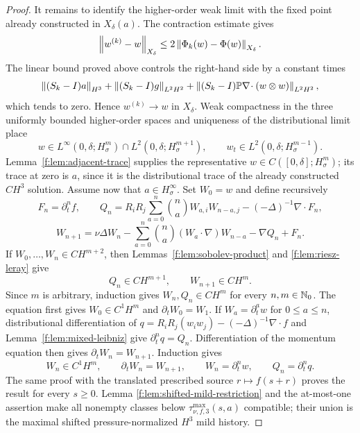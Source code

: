 \begin{proof}
It remains to identify the higher-order weak limit with the fixed point already
constructed in \(X_\delta(a)\).  The contraction estimate gives
\[
 \left\lVert w^{(k)}-w\right\rVert_{X_\delta}
 \le2\left\lVert \Phi_k(w)-\Phi(w)\right\rVert_{X_\delta}.
\]
The linear bound proved above controls the right-hand side by a constant times
\[
 \left\lVert (S_k-I)a\right\rVert_{H^3}
 +\left\lVert (S_k-I)g\right\rVert_{L^2H^2}
 +\left\lVert (S_k-I)\mathbb P\nabla\!\cdot(w\otimes w)\right\rVert_{L^2H^2},
\]
which tends to zero.  Hence \(w^{(k)}\to w\) in \(X_\delta\).  Weak
compactness in the three uniformly bounded higher-order spaces and uniqueness
of the distributional limit place
\[
 w\in L^\infty(0,\delta;H^m_\sigma)\cap L^2(0,\delta;H^{m+1}_\sigma),
 \qquad w_t\in L^2(0,\delta;H^{m-1}_\sigma).
\]
Lemma~\ref{f:lem:adjacent-trace} supplies the representative
\(w\in C([0,\delta];H^m_\sigma)\); its trace at zero is \(a\), since it is
the distributional trace of the already constructed \(C H^3\) solution.
Assume now that \(a\in H^\infty_\sigma\).  Set \(W_0=w\) and define
recursively
\[
 F_n=\partial_t^nf,\qquad
 Q_n=R_iR_j\sum_{a=0}^n\binom naW_{a,i}W_{n-a,j}
 -(-\Delta)^{-1}\nabla\cdot F_n,
\]
\[
 W_{n+1}=\nu\Delta W_n
 -\sum_{a=0}^n\binom na(W_a\cdot\nabla)W_{n-a}-\nabla Q_n+F_n.
\]
If \(W_0,\ldots,W_n\in C H^{m+2}\), then
Lemmas~\ref{f:lem:sobolev-product} and \ref{f:lem:riesz-leray} give
\[
 Q_n\in C H^{m+1},
 \qquad
 W_{n+1}\in C H^m.
\]
Since \(m\) is arbitrary, induction gives \(W_n,Q_n\in C H^m\) for every
\(n,m\in\mathbb N_0\).  The equation first gives
\(W_0\in C^1H^m\) and \(\partial_tW_0=W_1\).  If
\(W_a=\partial_t^aw\) for \(0\le a\le n\), distributional differentiation
of
\(
 q=R_iR_j(w_iw_j)-(-\Delta)^{-1}\nabla\cdot f
\)
and Lemma~\ref{f:lem:mixed-leibniz} give
\(\partial_t^nq=Q_n\).  Differentiation of the momentum equation then gives
\(\partial_tW_n=W_{n+1}\).  Induction gives
\[
 W_n\in C^1H^m,
 \qquad
 \partial_tW_n=W_{n+1},
 \qquad
 W_n=\partial_t^nw,
 \qquad
 Q_n=\partial_t^nq.
\]
The same proof with the translated prescribed source
\(r\mapsto f(s+r)\) proves the result for every \(s\ge0\).  Lemma
\ref{f:lem:shifted-mild-restriction} and the at-most-one assertion make all
nonempty classes below \(\tau_{\nu,f,3}^{\max}(s,a)\) compatible; their union
is the maximal shifted pressure-normalized \(H^3\) mild history.
\end{proof}
